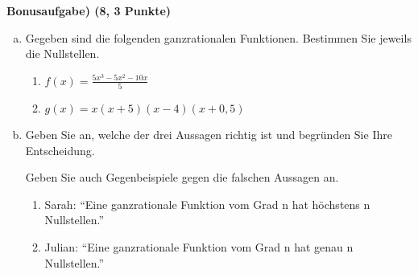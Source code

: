 \documentclass[a4paper,11pt, headsepline,headinclude]{scrreprt}
\newcommand{\AufgabeNrPkt}[2]{\vspace{5mm} \textbf{#1) \hfill (#2 Punkte)} }
\begin{document}
\AufgabeNrPkt{Bonusaufgabe}{8, 3}
\begin{enumerate}[a)]
 \item Gegeben sind die folgenden ganzrationalen Funktionen. Bestimmen Sie jeweils die Nullstellen.
  \begin{enumerate}[1.]
   \item $f(x)= \frac{5x^3-5x^2-10x}{5}$
   \item $g(x)= x(x+5)(x-4)(x+0,5)$
  \end{enumerate}
 \item Geben Sie an, welche der drei Aussagen richtig ist und begründen Sie Ihre Entscheidung.

Geben Sie auch Gegenbeispiele gegen die falschen Aussagen an.
 \begin{enumerate}[1.]
  \item Sarah:  \enquote{Eine ganzrationale Funktion vom Grad n hat höchstens n Nullstellen.}
  \item Julian: \enquote{Eine ganzrationale Funktion vom Grad n hat genau n Nullstellen.}
 \end{enumerate}

\end{enumerate}



{}
\end{document}

